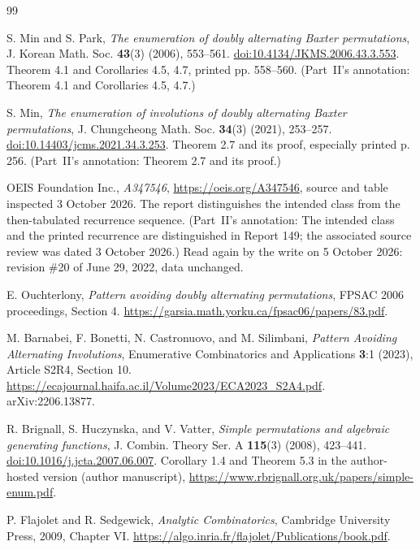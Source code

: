 \documentclass[11pt,letterpaper]{article}
\numberwithin{equation}{section}
\theoremstyle{remark}\newtheorem{remark}[theorem]{Remark}
\begin{document}
\begin{thebibliography}{99}
\raggedright
{}
S. Min and S. Park,
\emph{The enumeration of doubly alternating Baxter permutations},
J. Korean Math. Soc. \textbf{43}(3) (2006), 553--561.
\href{https://doi.org/10.4134/JKMS.2006.43.3.553}{doi:10.4134/JKMS.2006.43.3.553}.
Theorem 4.1 and Corollaries 4.5, 4.7, printed pp. 558--560. (Part~II's annotation: Theorem 4.1 and Corollaries 4.5, 4.7.)

S. Min,
\emph{The enumeration of involutions of doubly alternating Baxter permutations},
J. Chungcheong Math. Soc. \textbf{34}(3) (2021), 253--257.
\href{https://doi.org/10.14403/jcms.2021.34.3.253}{doi:10.14403/jcms.2021.34.3.253}.
Theorem 2.7 and its proof, especially printed p. 256. (Part~II's annotation: Theorem 2.7 and its proof.)

OEIS Foundation Inc.,
\emph{A347546}, \url{https://oeis.org/A347546},
source and table inspected 3 October 2026.
The report distinguishes the intended class from the then-tabulated recurrence sequence.
(Part~II's annotation: The intended class and the printed recurrence are distinguished in Report 149; the associated source review was dated 3 October 2026.)
Read again by the write on 5 October 2026: revision \#20 of June 29, 2022, data unchanged.

E. Ouchterlony,
\emph{Pattern avoiding doubly alternating permutations},
FPSAC 2006 proceedings, Section 4.
\url{https://garsia.math.yorku.ca/fpsac06/papers/83.pdf}.

M. Barnabei, F. Bonetti, N. Castronuovo, and M. Silimbani,
\emph{Pattern Avoiding Alternating Involutions},
Enumerative Combinatorics and Applications \textbf{3}:1 (2023), Article S2R4,
Section 10.
\url{https://ecajournal.haifa.ac.il/Volume2023/ECA2023_S2A4.pdf}.
arXiv:2206.13877.

R. Brignall, S. Huczynska, and V. Vatter,
\emph{Simple permutations and algebraic generating functions},
J. Combin. Theory Ser. A \textbf{115}(3) (2008), 423--441.
\href{https://doi.org/10.1016/j.jcta.2007.06.007}{doi:10.1016/j.jcta.2007.06.007}.
Corollary 1.4 and Theorem 5.3 in the author-hosted version (author manuscript),
\url{https://www.rbrignall.org.uk/papers/simple-enum.pdf}.

P. Flajolet and R. Sedgewick,
\emph{Analytic Combinatorics}, Cambridge University Press, 2009,
Chapter VI.
\url{https://algo.inria.fr/flajolet/Publications/book.pdf}.


\end{thebibliography}
\end{document}
